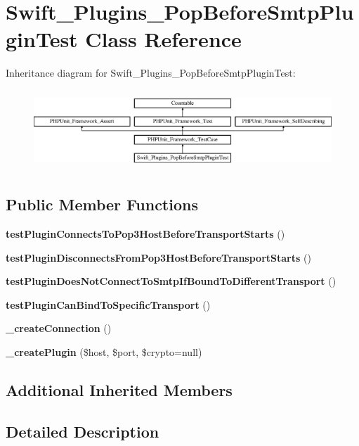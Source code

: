 \section{Swift\+\_\+\+Plugins\+\_\+\+Pop\+Before\+Smtp\+Plugin\+Test Class Reference}
\label{class_swift___plugins___pop_before_smtp_plugin_test}
Inheritance diagram for Swift\+\_\+\+Plugins\+\_\+\+Pop\+Before\+Smtp\+Plugin\+Test\+:\begin{figure}[H]
\begin{center}
\leavevmode
\includegraphics[height=3.022942cm]{class_swift___plugins___pop_before_smtp_plugin_test}
\end{center}
\end{figure}
\subsection*{Public Member Functions}
\begin{DoxyCompactItemize}
\item 
{\bf test\+Plugin\+Connects\+To\+Pop3\+Host\+Before\+Transport\+Starts} ()
\item 
{\bf test\+Plugin\+Disconnects\+From\+Pop3\+Host\+Before\+Transport\+Starts} ()
\item 
{\bf test\+Plugin\+Does\+Not\+Connect\+To\+Smtp\+If\+Bound\+To\+Different\+Transport} ()
\item 
{\bf test\+Plugin\+Can\+Bind\+To\+Specific\+Transport} ()
\item 
{\bf \+\_\+create\+Connection} ()
\item 
{\bf \+\_\+create\+Plugin} (\$host, \$port, \$crypto=null)
\end{DoxyCompactItemize}
\subsection*{Additional Inherited Members}


\subsection{Detailed Description}


